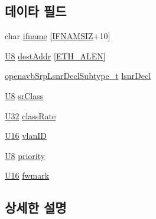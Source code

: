\subsection*{데이타 필드}
\begin{DoxyCompactItemize}
\item 
char \hyperlink{structopenavb_endpoint_params___talker_callback__t_a11d6071e5fa37b0c5776e17651485f11}{ifname} \mbox{[}\hyperlink{tl_2openavb__tl__pub_8h_acd06da230a96d3b7e6f193c5b3142002}{I\+F\+N\+A\+M\+S\+IZ}+10\mbox{]}
\item 
\hyperlink{openavb__types__base__pub_8h_aa63ef7b996d5487ce35a5a66601f3e73}{U8} \hyperlink{structopenavb_endpoint_params___talker_callback__t_a016f2167ae2143dcacd762c10be2f614}{dest\+Addr} \mbox{[}\hyperlink{avb__avtp_8h_a9822d89774e0d6ddaa06503950130423}{E\+T\+H\+\_\+\+A\+L\+EN}\mbox{]}
\item 
\hyperlink{openavb__srp__api_8h_afecaf0f6deca515a5b80d49fa8c3db8b}{openavb\+Srp\+Lsnr\+Decl\+Subtype\+\_\+t} \hyperlink{structopenavb_endpoint_params___talker_callback__t_a48a44c7abb58139ee25badb861e01a38}{lsnr\+Decl}
\item 
\hyperlink{openavb__types__base__pub_8h_aa63ef7b996d5487ce35a5a66601f3e73}{U8} \hyperlink{structopenavb_endpoint_params___talker_callback__t_a0ce524f0210a76139ed0aa1ae3ff24f4}{sr\+Class}
\item 
\hyperlink{openavb__types__base__pub_8h_a696390429f2f3b644bde8d0322a24124}{U32} \hyperlink{structopenavb_endpoint_params___talker_callback__t_a0bf28249cb23ce65c155693440118df5}{class\+Rate}
\item 
\hyperlink{openavb__types__base__pub_8h_a0a0a322d5fa4a546d293a77ba8b4a71f}{U16} \hyperlink{structopenavb_endpoint_params___talker_callback__t_a6f9e150f3345cb797072070d8972aec8}{vlan\+ID}
\item 
\hyperlink{openavb__types__base__pub_8h_aa63ef7b996d5487ce35a5a66601f3e73}{U8} \hyperlink{structopenavb_endpoint_params___talker_callback__t_a311f8b040417772c36534cb9ba9612d5}{priority}
\item 
\hyperlink{openavb__types__base__pub_8h_a0a0a322d5fa4a546d293a77ba8b4a71f}{U16} \hyperlink{structopenavb_endpoint_params___talker_callback__t_aa85f3b4d09e67b5646061656ebc3b9c5}{fwmark}
\end{DoxyCompactItemize}


\subsection{상세한 설명}


